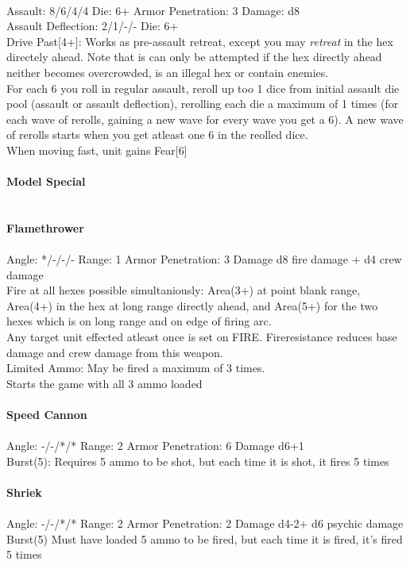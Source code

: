 \ \\
Assault: 8/6/4/4 Die: 6+ Armor Penetration: 3 Damage: d8 \\
Assault Deflection: 2/1/-/- Die: 6+\\
\indent Drive Past[4+]: Works as pre-assault retreat, except you may {\it retreat} in the hex directely ahead. Note that is can only be attempted if the hex directly ahead neither becomes overcrowded, is an illegal hex or contain enemies. \\ For each 6 you roll in regular assault, reroll up too 1 dice from initial assault die pool (assault or assault deflection), rerolling each die a maximum of 1 times (for each wave of rerolls, gaining a new wave for every wave you get a 6). A new wave of rerolls starts when you get atleast one 6 in the reolled dice. \\ When moving fast, unit gains Fear[6] \\
\ \\
{\bf Model Special} \\

\ \\
\ \\
{\bf Flamethrower } \\
\ \\
Angle: */-/-/- Range: 1 Armor Penetration: 3 Damage d8 fire damage + d4 crew damage \\
\indent Fire at all hexes possible simultaniously: Area(3+) at point blank range, Area(4+) in the hex at long range directly ahead, and Area(5+) for the two hexes which is on long range and on edge of firing arc. \\ Any target unit effected atleast once is set on FIRE. Fireresistance reduces base damage and crew damage from this weapon. \\ Limited Ammo: May be fired a maximum of 3 times. \\ Starts the game with all 3 ammo loaded \\



\ \\
{\bf Speed Cannon } \\
\ \\
Angle: -/-/*/* Range: 2 Armor Penetration: 6 Damage d6+1 \\
\indent Burst(5): Requires 5 ammo to be shot, but each time it is shot, it fires 5 times \\



\ \\
{\bf Shriek } \\
\ \\
Angle: -/-/*/* Range: 2 Armor Penetration: 2 Damage d4-2+ d6 psychic damage \\
\indent Burst(5) Must have loaded 5 ammo to be fired, but each time it is fired, it's fired 5 times \\






